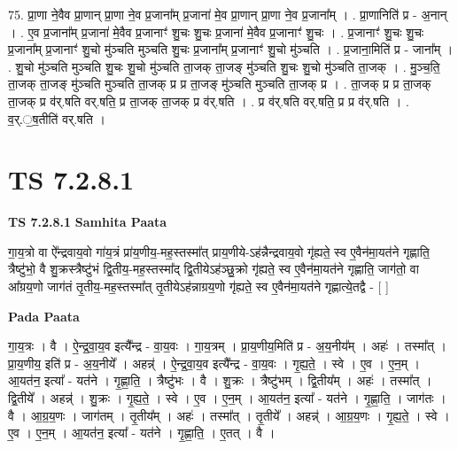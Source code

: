 \documentclass[17pt]{extarticle}
\begin{document}
75. प्रा॒णा ने॒वैव प्रा॒णान् प्रा॒णा ने॒व प्र॒जाना᳚म् प्र॒जाना॑ मे॒व प्रा॒णान् प्रा॒णा ने॒व प्र॒जाना᳚म् । . प्रा॒णानिति॑ प्र - अ॒नान् । . ए॒व प्र॒जाना᳚म् प्र॒जाना॑ मे॒वैव प्र॒जानाꣳ॑ शु॒चः शु॒चः प्र॒जाना॑ मे॒वैव प्र॒जानाꣳ॑ शु॒चः । . प्र॒जानाꣳ॑ शु॒चः शु॒चः प्र॒जाना᳚म् प्र॒जानाꣳ॑ शु॒चो मु॑ञ्चति मुञ्चति शु॒चः प्र॒जाना᳚म् प्र॒जानाꣳ॑ शु॒चो मु॑ञ्चति । . प्र॒जाना॒मिति॑ प्र - जाना᳚म् । . शु॒चो मु॑ञ्चति मुञ्चति शु॒चः शु॒चो मु॑ञ्चति ता॒जक् ता॒जङ् मु॑ञ्चति शु॒चः शु॒चो मु॑ञ्चति ता॒जक् । . मु॒ञ्च॒ति॒ ता॒जक् ता॒जङ् मु॑ञ्चति मुञ्चति ता॒जक् प्र प्र ता॒जङ् मु॑ञ्चति मुञ्चति ता॒जक् प्र । . ता॒जक् प्र प्र ता॒जक् ता॒जक् प्र व॑र्.षति वर्.षति॒ प्र ता॒जक् ता॒जक् प्र व॑र्.षति । . प्र व॑र्.षति वर्.षति॒ प्र प्र व॑र्.षति । . व॒र्.॒ष॒तीति॑ वर्.षति । \newline
\pagebreak
{}

\section{ TS 7.2.8.1 }

\textbf{TS 7.2.8.1 } \newline
\textbf{Samhita Paata} \newline

गा॒य॒त्रो वा ऐ᳚न्द्रवाय॒वो गा॑य॒त्रं प्रा॑य॒णीय॒-मह॒स्तस्मा᳚त् प्राय॒णीये-ऽह॑न्नैन्द्रवाय॒वो गृ॑ह्यते॒ स्व ए॒वैन॑मा॒यत॑ने गृह्णाति॒ त्रैष्टु॑भो॒ वै शु॒क्रस्त्रैष्टु॑भं द्वि॒तीय॒-मह॒स्तस्मा᳚द् द्वि॒तीयेऽह॑ञ्छु॒क्रो गृ॑ह्यते॒ स्व ए॒वैन॑मा॒यत॑ने गृह्णाति॒ जाग॑तो॒ वा आ᳚ग्रय॒णो जाग॑तं तृ॒तीय॒-मह॒स्तस्मा᳚त् तृ॒तीयेऽह॑न्नाग्रय॒णो गृ॑ह्यते॒ स्व ए॒वैन॑मा॒यत॑ने गृह्णात्ये॒तद्वै - [  ] \newline

\textbf{Pada Paata} \newline

गा॒य॒त्रः । वै । ऐ॒न्द्र॒वा॒य॒व इत्यै᳚न्द्र - वा॒य॒वः । गा॒य॒त्रम् । प्रा॒य॒णीय॒मिति॑ प्र - अ॒य॒नीय᳚म् । अहः॑ । तस्मा᳚त् । प्रा॒य॒णीय॒ इति॑ प्र - अ॒य॒नीये᳚ । अहन्न्॑ । ऐ॒न्द्र॒वा॒य॒व इत्यै᳚न्द्र - वा॒य॒वः । गृ॒ह्य॒ते॒ । स्वे । ए॒व । ए॒न॒म् । आ॒यत॑न॒ इत्या᳚ - यत॑ने । गृ॒ह्णा॒ति॒ । त्रैष्टु॑भः । वै । शु॒क्रः । त्रैष्टु॑भम् । द्वि॒तीय᳚म् । अहः॑ । तस्मा᳚त् । द्वि॒तीये᳚ । अहन्न्॑ । शु॒क्रः । गृ॒ह्य॒ते॒ । स्वे । ए॒व । ए॒न॒म् । आ॒यत॑न॒ इत्या᳚ - यत॑ने । गृ॒ह्णा॒ति॒ । जाग॑तः । वै । आ॒ग्र॒य॒णः । जाग॑तम् । तृ॒तीय᳚म् । अहः॑ । तस्मा᳚त् । तृ॒तीये᳚ । अहन्न्॑ । आ॒ग्र॒य॒णः । गृ॒ह्य॒ते॒ । स्वे । ए॒व । ए॒न॒म् । आ॒यत॑न॒ इत्या᳚ - यत॑ने । गृ॒ह्णा॒ति॒ । ए॒तत् । वै ।  \newline
\end{document}
